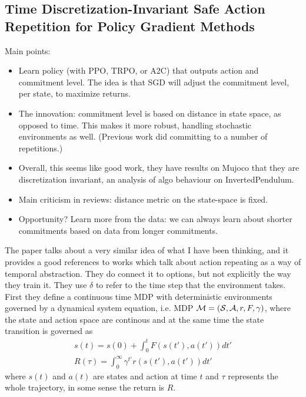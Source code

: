 \documentclass[11pt]{article}
\begin{document}
\newcommand{\delt}{{\delta t}}
\subsection{Time Discretization-Invariant Safe Action Repetition for Policy Gradient Methods} \cite{park2021time}

Main points:

\begin{itemize}
    \item Learn policy (with PPO, TRPO, or A2C) that outputs action and commitment level.  The idea is that SGD will adjust the commitment level, per state, to maximize returns.
    \item The innovation: commitment level is based on distance in state space, as opposed to time. This makes it more robust, handling stochastic environments as well. (Previous work did committing to a number of repetitions.)
    \item Overall, this seems like good work, they have results on Mujoco that they are discretization invariant, an analysis of algo behaviour on InvertedPendulum.
    \item Main criticism in reviews: distance metric on the state-space is fixed.
    \item Opportunity? Learn more from the data: we can always learn about shorter commitments based on data from longer commitments.
\end{itemize}


The paper talks about a very similar idea of what I have been thinking, and it provides a good references to works which talk about action repeating as a way of temporal abstraction. They do connect it to options, but not explicitly the way they train it. They use $\delta$ to refer to the time step that the environment takes. 
First they define a continuous time MDP with deterministic environments governed by a dynamical system equation, i.e. MDP ${\mathcal{M}} = ({\mathcal{S}} , {\mathcal{A}}, r, F, \gamma) $, where the state and action space are continous and at the same time the state transition is governed as 
\begin{align*}
    s(t) = s(0) + \int_{0}^{t} F(s(t'), a(t'))dt'\\
    R(\tau) = \int_{0}^{\infty} \gamma^{t'} r(s(t'), a(t')) dt'
\end{align*}
where $s(t)$ and $a(t)$ are states and action at time $t$ and $\tau$ represents the whole trajectory, in some sense the return is $R$. 
\end{document}
